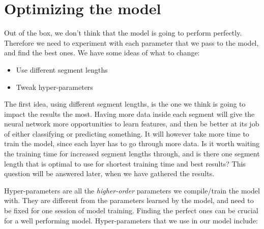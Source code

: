 \section{Optimizing the model}

\noindent Out of the box, we don't think that the model is going to perform perfectly. Therefore we need to experiment with each parameter that we pass to
the model, and find the best ones. We have some ideas of what to change:

\begin{itemize}
    \item Use different segment lengths
    \item Tweak hyper-parameters
\end{itemize}

\noindent The first idea, using different segment lengths, is the one we think is going to impact the results the most. Having more data inside each segment 
will give the neural network more opportunities to learn features, and then be better at its job of either classifying or predicting something. 
It will however take more time to train the model, since each layer has to go through more data. Is it worth waiting the training time 
for increased segment lengths through, and is there one segment length that is optimal to use for shortest training time and best results?
This question will be answered later, when we have gathered the results.

Hyper-parameters are all the \textit{higher-order} parameters we compile/train the model with. They are different from the parameters learned by
the model, and need to be fixed for one session of model training. Finding the perfect ones can be crucial for a well performing model. 
Hyper-parameters that we use in our model include:

